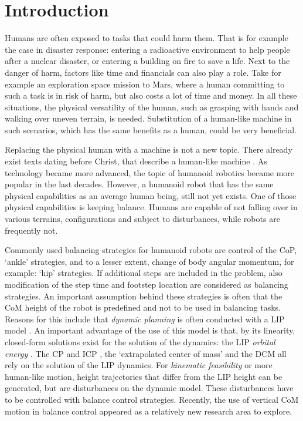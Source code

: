 %
\chapter{Introduction} \label{chap::intro}
Humans are often exposed to tasks that could harm them. That is for example the case in disaster response: entering a radioactive environment to help people after a nuclear disaster, or entering a building on fire to save a life. Next to the danger of harm, factors like time and financials can also play a role. Take for example an exploration space mission to Mars, where a human committing to such a task is in risk of harm, but also costs a lot of time and money. In all these situations, the physical versatility of the human, such as grasping with hands and walking over uneven terrain, is needed. Substitution of a human-like machine in such scenarios, which has the same benefits as a human, could be very beneficial. 

Replacing the physical human with a machine is not a new topic. There already exist texts dating before Christ, that describe a human-like machine \cite{behnke2008humanoid}. As technology became more advanced, the topic of humanoid robotics became more popular in the last decades. However, a humanoid robot that has the same physical capabilities as an average human being, still not yet exists. One of those physical capabilities is keeping balance. Humans are capable of not falling over in various terrains, configurations and subject to disturbances, while robots are frequently not. 

Commonly used balancing strategies for humanoid robots are control of the \ac{CoP}, `ankle' strategies, and to a lesser extent, change of body angular momentum, for example: `hip' strategies. If additional steps are included in the problem, also modification of the step time and footstep location are considered as balancing strategies. An important assumption behind these strategies is often that the \ac{CoM} height of the robot is predefined and not to be used in balancing tasks. Reasons for this include that \textit{dynamic planning} is often conducted with a \ac{LIP} model \cite{kajita20013d}. An important advantage of the use of this model is that, by its linearity, closed-form solutions exist for the solution of the dynamics: the \ac{LIP} \textit{orbital energy} \cite{kajita1992dynamic}. The \ac{CP} \cite{pratt2006capture} and \ac{ICP} \cite{koolen2012capturability}, the `extrapolated center of mass' \cite{hof2008extrapolated} and the \ac{DCM} \cite{takenaka2009real} all rely on the solution of the \ac{LIP} dynamics. For \textit{kinematic feasibility} or more human-like motion, height trajectories that differ from the \ac{LIP} height  can be generated, but are disturbances on the dynamic model. These disturbances have to be controlled with balance control strategies. Recently, the use of vertical \ac{CoM} motion in balance control appeared as a relatively new research area to explore.

